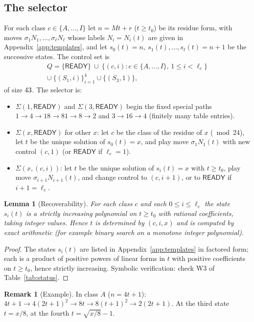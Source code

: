\documentclass[11pt]{article}
\newtheorem{lemma}[theorem]{Lemma}
\theoremstyle{definition}
\newtheorem{remark}[theorem]{Remark}
\newcommand{\RDY}{\mathsf{READY}}
\begin{document}
\subsection{The selector}
For each class $c\in\{A,\dots,I\}$ let $n=Mt+r$ ($t\ge t_0$) be its residue form, with moves $\sigma_1N_1,\dots,\sigma_\ell N_\ell$ whose labels $N_i=N_i(t)$ are given in Appendix~\ref{app:templates}, and let
$s_0(t)=n,\ s_1(t),\dots,s_\ell(t)=n+1$ be the successive states. The control set is
\begin{multline*} Q=\{\RDY\}\ \cup\ \{(c,i):c\in\{A,\dots,I\},\,1\le i<\ell_c\}\\ \cup\ \{(S_1,i)\}_{i=1}^4\cup\{(S_3,1)\}, \end{multline*}
of size $43$. The selector is:
\begin{itemize}[nosep]
\item $\Sigma(1,\RDY)$ and $\Sigma(3,\RDY)$ begin the fixed special paths $1\to4\to18\to81\to8\to2$ and $3\to16\to4$ (finitely many table entries).
\item $\Sigma(x,\RDY)$ for other $x$: let $c$ be the class of the residue of $x$ ($\bmod 24$), let $t$ be the unique solution of $s_0(t)=x$, and play move $\sigma_1N_1(t)$ with new control $(c,1)$ (or $\RDY$ if $\ell_c=1$).
\item $\Sigma(x,(c,i))$: let $t$ be the unique solution of $s_i(t)=x$ with $t\ge t_0$, play move $\sigma_{i+1}N_{i+1}(t)$, and change control to $(c,i+1)$, or to $\RDY$ if $i+1=\ell_c$.
\end{itemize}

\begin{lemma}[Recoverability]\label{lem:recover}
For each class $c$ and each $0\le i\le\ell_c$ the state $s_i(t)$ is a strictly increasing polynomial on $t\ge t_0$ with rational coefficients, taking integer values.
Hence $t$ is determined by $(c,i,x)$ and is computed by exact arithmetic (for example binary search on a monotone integer polynomial).
\end{lemma}
\begin{proof} The states $s_i(t)$ are listed in Appendix~\ref{app:templates} in factored form; each is a product of positive powers of linear forms in $t$ with positive coefficients
on $t\ge t_0$, hence strictly increasing. Symbolic verification: check W3 of Table~\ref{tab:status}. \end{proof}
\begin{remark}[Example] In class $A$ ($n=4t+1$): $4t+1\to4(2t+1)^2\to8t\to8(t+1)^2\to2(2t+1)$. At the third state $t=x/8$, at the fourth $t=\sqrt{x/8}-1$.\end{remark}
\end{document}
